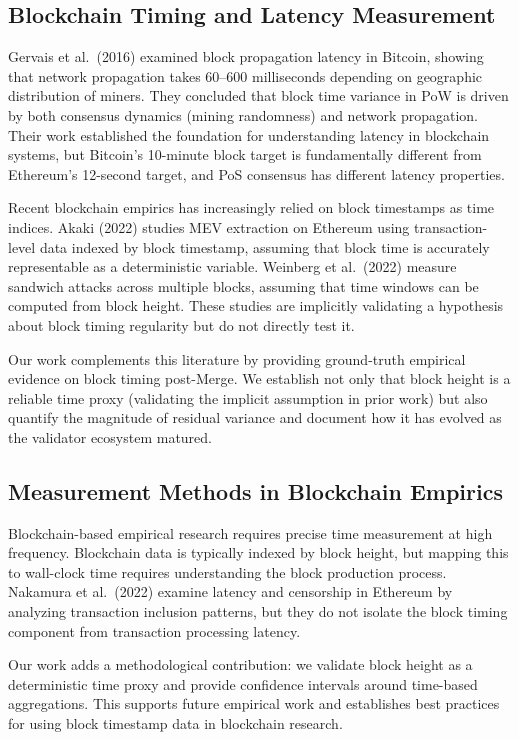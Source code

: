 \documentclass[12pt]{article}
\begin{document}
\subsection{Blockchain Timing and Latency Measurement}

Gervais et al.~(2016) examined block propagation latency in Bitcoin, showing that network propagation takes 60–600 milliseconds depending on geographic distribution of miners. They concluded that block time variance in PoW is driven by both consensus dynamics (mining randomness) and network propagation. Their work established the foundation for understanding latency in blockchain systems, but Bitcoin's 10-minute block target is fundamentally different from Ethereum's 12-second target, and PoS consensus has different latency properties.

Recent blockchain empirics has increasingly relied on block timestamps as time indices. Akaki (2022) studies MEV extraction on Ethereum using transaction-level data indexed by block timestamp, assuming that block time is accurately representable as a deterministic variable. Weinberg et al.~(2022) measure sandwich attacks across multiple blocks, assuming that time windows can be computed from block height. These studies are implicitly validating a hypothesis about block timing regularity but do not directly test it.

Our work complements this literature by providing ground-truth empirical evidence on block timing post-Merge. We establish not only that block height is a reliable time proxy (validating the implicit assumption in prior work) but also quantify the magnitude of residual variance and document how it has evolved as the validator ecosystem matured.

\subsection{Measurement Methods in Blockchain Empirics}

Blockchain-based empirical research requires precise time measurement at high frequency. Blockchain data is typically indexed by block height, but mapping this to wall-clock time requires understanding the block production process. Nakamura et al.~(2022) examine latency and censorship in Ethereum by analyzing transaction inclusion patterns, but they do not isolate the block timing component from transaction processing latency.

Our work adds a methodological contribution: we validate block height as a deterministic time proxy and provide confidence intervals around time-based aggregations. This supports future empirical work and establishes best practices for using block timestamp data in blockchain research.
\end{document}

